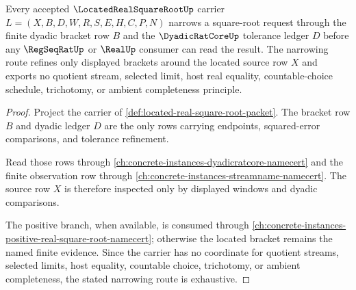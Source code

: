 \begin{theorem}
\label{thm:located-real-square-root-bracket}
Every accepted $\LocatedRealSquareRootUp$ carrier $L=(X,B,D,W,R,S,E,H,C,P,N)$ narrows a square-root request through the finite dyadic bracket row $B$ and the $\DyadicRatCoreUp$ tolerance ledger $D$ before any $\RegSeqRatUp$ or $\RealUp$ consumer can read the result. The narrowing route refines only displayed brackets around the located source row $X$ and exports no quotient stream, selected limit, host real equality, countable-choice schedule, trichotomy, or ambient completeness principle.
\end{theorem}
\begin{proof}
Project the carrier of \autoref{def:located-real-square-root-packet}. The bracket row $B$ and dyadic ledger $D$ are the only rows carrying endpoints, squared-error comparisons, and tolerance refinement.

Read those rows through \autoref{ch:concrete-instances-dyadicratcore-namecert} and the finite observation row through \autoref{ch:concrete-instances-streamname-namecert}. The source row $X$ is therefore inspected only by displayed windows and dyadic comparisons.

The positive branch, when available, is consumed through \autoref{ch:concrete-instances-positive-real-square-root-namecert}; otherwise the located bracket remains the named finite evidence. Since the carrier has no coordinate for quotient streams, selected limits, host equality, countable choice, trichotomy, or ambient completeness, the stated narrowing route is exhaustive.
\end{proof}

